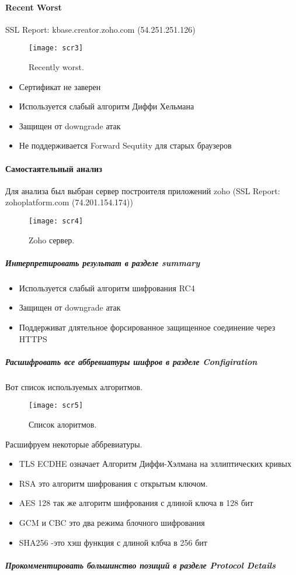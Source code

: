 \documentclass{article}
\begin{document}
\paragraph{Recent Worst}
 SSL Report: kbase.creator.zoho.com (54.251.251.126)
\begin{figure}[h!]
	\centering
	\texttt{[image: scr3]}
	\caption{Recently worst.}
\end{figure}
\begin{itemize}
	\item Сертификат не заверен
	\item Используется слабый алгоритм Диффи Хельмана
	\item Защищен от downgrade атак
	\item Не поддерживается Forward Sequtity для старых браузеров
\end{itemize}
\clearpage
\paragraph{Самостаятельный анализ}
Для анализа был выбран сервер построителя приложений zoho (SSL Report: zohoplatform.com (74.201.154.174))
\begin{figure}[h!]
	\centering
	\texttt{[image: scr4]}
	\caption{Zoho сервер.}
\end{figure}

\subparagraph{Интерпретировать результат в разделе summary}
\begin{itemize}
	\item Используется слабый алгоритм шифрования RC4
	\item Защищен от downgrade атак
	\item Поддерживат длятельное форсированное защищенное соединение через  HTTPS
\end{itemize}
\clearpage
\subparagraph{Расшифровать все аббревиатуры шифров в разделе Configiration}

Вот список используемых алгоритмов.

\begin{figure}[h!]
	\centering
	\texttt{[image: scr5]}
	\caption{Список алоритмов.}
\end{figure}
Расшифруем некоторые аббревиатуры.

\begin{itemize}
	\item TLS ECDHE означает Алгоритм Диффи-Хэлмана на эллиптических кривых
	\item RSA это алгоритм шифрования с открытым ключом.
	\item AES 128 так же алгоритм шифрования с длиной ключа в 128 бит
	\item GCM и CBC это два режима блочного шифрования
	\item SHA256 -это хэш функция с длиной клбча в 256 бит
\end{itemize}
\clearpage
\subparagraph{Прокомментировать большинство позиций в разделе Protocol Details}
\end{document}
